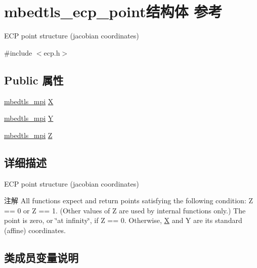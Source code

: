 \hypertarget{structmbedtls__ecp__point}{}\section{mbedtls\+\_\+ecp\+\_\+point结构体 参考}
\label{structmbedtls__ecp__point}


E\+CP point structure (jacobian coordinates)  




{\ttfamily \#include $<$ecp.\+h$>$}

\subsection*{Public 属性}
\begin{DoxyCompactItemize}
\item 
\hyperlink{structmbedtls__mpi}{mbedtls\+\_\+mpi} \hyperlink{structmbedtls__ecp__point_ac8ab6fd8f0f1173e6da5a4abcff1f0bf}{X}
\item 
\hyperlink{structmbedtls__mpi}{mbedtls\+\_\+mpi} \hyperlink{structmbedtls__ecp__point_af8fb56647185a0186c7a3c54eea30a4d}{Y}
\item 
\hyperlink{structmbedtls__mpi}{mbedtls\+\_\+mpi} \hyperlink{structmbedtls__ecp__point_a83c24649cb4c1ed8aae6449a29d094e5}{Z}
\end{DoxyCompactItemize}


\subsection{详细描述}
E\+CP point structure (jacobian coordinates) 

\begin{DoxyNote}{注解}
All functions expect and return points satisfying the following condition\+: Z == 0 or Z == 1. (Other values of Z are used by internal functions only.) The point is zero, or \char`\"{}at infinity\char`\"{}, if Z == 0. Otherwise, \hyperlink{class_x}{X} and Y are its standard (affine) coordinates. 
\end{DoxyNote}


\subsection{类成员变量说明}
\mbox{\label{structmbedtls__ecp__point_ac8ab6fd8f0f1173e6da5a4abcff1f0bf}} 
